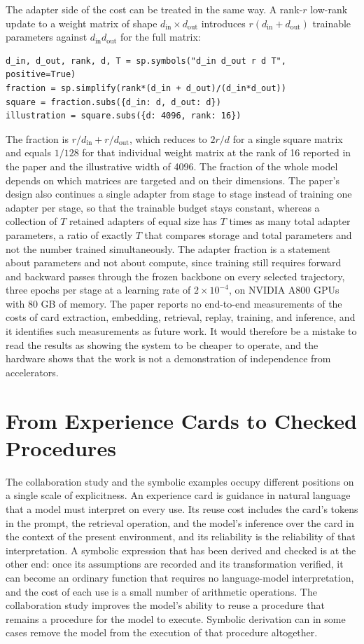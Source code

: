 \documentclass[11pt]{article}
\theoremstyle{remark}
\begin{document}
The adapter side of the cost can be treated in the same way. A rank-$r$ low-rank update to a weight matrix of shape $d_{\mathrm{in}} \times d_{\mathrm{out}}$ introduces $r(d_{\mathrm{in}} + d_{\mathrm{out}})$ trainable parameters against $d_{\mathrm{in}} d_{\mathrm{out}}$ for the full matrix:
\begin{verbatim}
d_in, d_out, rank, d, T = sp.symbols("d_in d_out r d T", positive=True)
fraction = sp.simplify(rank*(d_in + d_out)/(d_in*d_out))
square = fraction.subs({d_in: d, d_out: d})
illustration = square.subs({d: 4096, rank: 16})
\end{verbatim}
The fraction is $r/d_{\mathrm{in}} + r/d_{\mathrm{out}}$, which reduces to $2r/d$ for a single square matrix and equals $1/128$ for that individual weight matrix at the rank of 16 reported in the paper and the illustrative width of 4096. The fraction of the whole model depends on which matrices are targeted and on their dimensions. The paper's design also continues a single adapter from stage to stage instead of training one adapter per stage, so that the trainable budget stays constant, whereas a collection of $T$ retained adapters of equal size has $T$ times as many total adapter parameters, a ratio of exactly $T$ that compares storage and total parameters and not the number trained simultaneously. The adapter fraction is a statement about parameters and not about compute, since training still requires forward and backward passes through the frozen backbone on every selected trajectory, three epochs per stage at a learning rate of $2 \times 10^{-4}$, on NVIDIA A800 GPUs with 80 GB of memory. The paper reports no end-to-end measurements of the costs of card extraction, embedding, retrieval, replay, training, and inference, and it identifies such measurements as future work. It would therefore be a mistake to read the results as showing the system to be cheaper to operate, and the hardware shows that the work is not a demonstration of independence from accelerators.

\section{From Experience Cards to Checked Procedures}\label{sec:progression}

The collaboration study and the symbolic examples occupy different positions on a single scale of explicitness. An experience card is guidance in natural language that a model must interpret on every use. Its reuse cost includes the card's tokens in the prompt, the retrieval operation, and the model's inference over the card in the context of the present environment, and its reliability is the reliability of that interpretation. A symbolic expression that has been derived and checked is at the other end: once its assumptions are recorded and its transformation verified, it can become an ordinary function that requires no language-model interpretation, and the cost of each use is a small number of arithmetic operations. The collaboration study improves the model's ability to reuse a procedure that remains a procedure for the model to execute. Symbolic derivation can in some cases remove the model from the execution of that procedure altogether.
\end{document}
